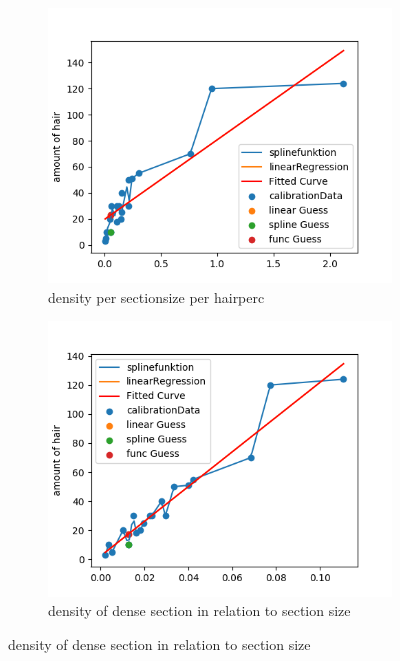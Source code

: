 \documentclass[german,a4paper, 12pt]{scrartcl}
\begin{document}
\begin{figure}[H]
	\medskip
	\begin{subfigure}{0.48\textwidth}
		\includegraphics[width=1.1\linewidth]{figBina/g3.png}
		\caption{density per sectionsize per hairperc} \label{fig:c}
	\end{subfigure}\hspace*{\fill}
	\begin{subfigure}{0.48\textwidth}
		\includegraphics[width=1.1\linewidth]{figBina/g4.png}
		\caption{density of dense section in relation to section size} \label{fig:d}
	\end{subfigure}
	

\end{figure}
\end{document}
